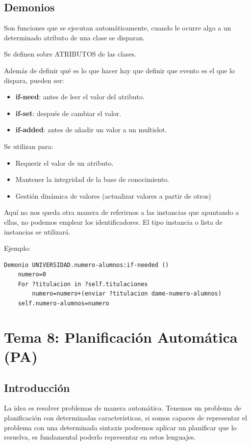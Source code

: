 \documentclass[12pt, twoside, openright]{report} %
\begin{document}
\section{Demonios}
Son funciones que se ejecutan automáticamente, cuando le ocurre algo a un determinado atributo de una clase se disparan.

Se definen sobre ATRIBUTOS de las clases.

Además de definir qué es lo que hacer hay que definir que evento es el que lo dispara, pueden ser:
\begin{itemize}
	\item \textbf{if-need}: antes de leer el valor del atributo.
	\item \textbf{if-set}: después de cambiar el valor.
	\item \textbf{if-added}: antes de añadir un valor a un multislot.
\end{itemize}

Se utilizan para:
\begin{itemize}
	\item Requerir el valor de un atributo.
	\item Mantener la integridad de la base de conocimiento.
	\item Gestión dinámica de valores (actualizar valores a partir de otros)
\end{itemize}

Aquí no nos queda otra manera de referirnos a las instancias que apuntando a ellas, no podemos emplear los identificadores. El tipo instancia o lista de instancias se utilizará.
\pagebreak

Ejemplo:
\begin{lstlisting}
Demonio UNIVERSIDAD.numero-alumnos:if-needed ()
	numero=0
	For ?titulacion in ?self.titulaciones
		numero=numero+(enviar ?titulacion dame-numero-alumnos)
	self.numero-alumnos=numero
\end{lstlisting}

\chapter{Tema 8: Planificación Automática (PA)}

\section{Introducción}
La idea es resolver problemas de manera automática. Tenemos un problema de planificación con determinadas características, si somos capaces de representar el problema con una determinada sintaxis podremos aplicar un planificar que lo resuelva, es fundamental poderlo representar en estos lenguajes.
\end{document}

